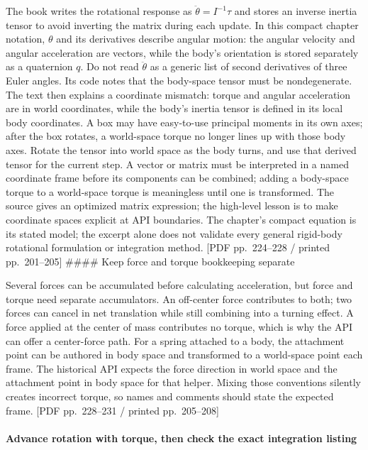 The book writes the rotational response as \(\ddot{\theta}=I^{-1}\tau\) and stores an inverse inertia tensor to avoid inverting the matrix during each update. In this compact chapter notation, \(\theta\) and its derivatives describe angular motion: the angular velocity and angular acceleration are vectors, while the body's orientation is stored separately as a quaternion \(q\). Do not read \(\ddot{\theta}\) as a generic list of second derivatives of three Euler angles. Its code notes that the body-space tensor must be nondegenerate. The text then explains a coordinate mismatch: torque and angular acceleration are in world coordinates, while the body's inertia tensor is defined in its local body coordinates. A box may have easy-to-use principal moments in its own axes; after the box rotates, a world-space torque no longer lines up with those body axes. Rotate the tensor into world space as the body turns, and use that derived tensor for the current step. A vector or matrix must be interpreted in a named coordinate frame before its components can be combined; adding a body-space torque to a world-space torque is meaningless until one is transformed. The source gives an optimized matrix expression; the high-level lesson is to make coordinate spaces explicit at API boundaries. The chapter's compact equation is its stated model; the excerpt alone does not validate every general rigid-body rotational formulation or integration method. {[}PDF pp.~224--228 / printed pp.~201--205{]} \#\#\#\# Keep force and torque bookkeeping separate

Several forces can be accumulated before calculating acceleration, but force and torque need separate accumulators. An off-center force contributes to both; two forces can cancel in net translation while still combining into a turning effect. A force applied at the center of mass contributes no torque, which is why the API can offer a center-force path. For a spring attached to a body, the attachment point can be authored in body space and transformed to a world-space point each frame. The historical API expects the force direction in world space and the attachment point in body space for that helper. Mixing those conventions silently creates incorrect torque, so names and comments should state the expected frame. {[}PDF pp.~228--231 / printed pp.~205--208{]}

\paragraph{Advance rotation with torque, then check the exact integration listing}\label{06-engine-ii-ch033-advance-rotation-with-torque-then-check-the-exact-integration-listing}

